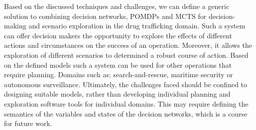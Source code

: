 \documentclass[conference]{IEEEtran}
\begin{document}
Based on the discussed techniques and challenges, we can define a generic solution to combining decision networks, POMDPs and MCTS for decision-making and scenario exploration in the drug trafficking domain. Such a system can offer decision makers the opportunity to explore the effects of different actions and circumstances on the success of an operation. Moreover, it allows the exploration of different scenarios to determined a robust course of action.
Based on the defined models such a system can be used for other operations that require planning. Domains such as: search-and-rescue, maritime security or autonomous surveillance. Ultimately, the challenges faced should be confined to designing suitable models, rather than developing individual planning and exploration software tools for individual domains. This may require defining the semantics of the variables and states of the decision networks, which is a course for future work.



\end{document}
